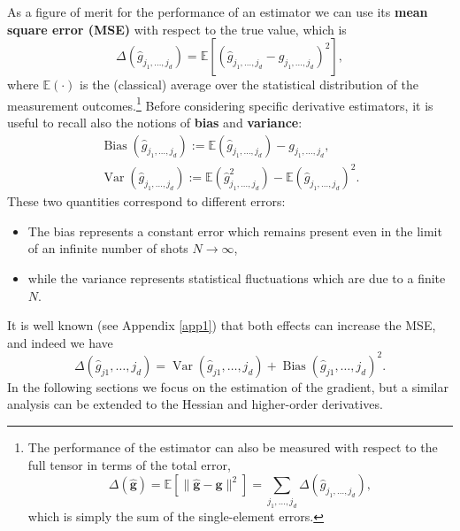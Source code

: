 As a figure of merit for the performance of an estimator we can use its \textbf{mean square error (MSE)} with respect to the true value, which is
\begin{equation}
    \Delta\left(\hat{g}_{j_1, \ldots, j_d}\right)=\mathbb{E}\left[\left(\hat{g}_{j_1, \ldots, j_d}-g_{j_1, \ldots, j_d}\right)^2\right],
\end{equation}
where $\mathbb{E}(\cdot)$ is the (classical) average over the statistical distribution of the measurement outcomes.\footnote{The performance of the estimator can also be measured with respect to the full tensor in terms of the total error,
\begin{equation}
    \Delta(\hat{\boldsymbol{g}})=\mathbb{E}\left[\|\hat{\boldsymbol{g}}-\boldsymbol{g}\|^2\right]=\sum_{j_1, \ldots, j_d} \Delta\left(\hat{g}_{j_1, \ldots, j_d}\right),
\end{equation}
which is simply the sum of the single-element errors.}
Before considering specific derivative estimators, it is useful to recall also the notions of \textbf{bias} and \textbf{variance}:
\begin{equation}
    \begin{gathered}
\operatorname{Bias}\left(\hat{g}_{j_1, \ldots, j_d}\right):=\mathbb{E}\left(\hat{g}_{j_1, \ldots, j_d}\right)-g_{j_1, \ldots, j_d}, \\
\operatorname{Var}\left(\hat{g}_{j_1, \ldots, j_d}\right):=\mathbb{E}\left(\hat{g}_{j_1, \ldots, j_d}^2\right)-\mathbb{E}\left(\hat{g}_{j_1, \ldots, j_d}\right)^2 .
\end{gathered}
\end{equation}
These two quantities correspond to different errors: 
\begin{itemize}
    \item The bias represents a constant error which remains present even in the limit of an infinite number of shots $N \rightarrow \infty$,
    \item while the variance represents statistical fluctuations which are due to a finite $N$.
\end{itemize}
 It is well known (see Appendix \ref{app1}) that both effects can increase the MSE, and indeed we have
\begin{equation}
    \Delta\left(\hat{g}_{j 1}, \ldots, j_d\right)=\operatorname{Var}\left(\hat{g}_{j 1}, \ldots, j_d\right)+\operatorname{Bias}\left(\hat{g}_{j 1}, \ldots, j_d\right)^2 .
\end{equation}
In the following sections we focus on the estimation of the gradient, but a similar analysis can be extended to the Hessian and higher-order derivatives.


